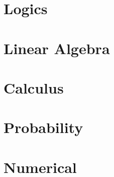 \documentclass[11pt,journal,compsoc]{IEEEtran}
\begin{document}
\section{Logics}


\section{Linear Algebra}


\section{Calculus}


\section{Probability}


\section{Numerical}
\end{document}
